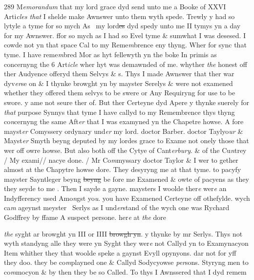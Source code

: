\documentclass[12pt, a4paper]{book}
\begin{document}
{\color{Mahogany}289} M\textit{emorandum} that my lord grace dyd send unto me a Booke of XXVI Arti\textit{cles that} I shelde make Awnswer unto them wyth spede. Trewly y had so lytyle a tyme for so mych As  my lord\sout{es}
               dyd 
			spedy unto me II tymys yn a day for my Awnswer. ffor so mych as I had so Evel tyme \& sumwhat I was desesed. I cowde not yn that space Cal to my Reme\textit{m}brence eny thyng. Wher for sync that tyme. I have reme\textit{m}bred Mor as hyt fellewyth yn the boke  In primis as concernyng the 6 Art\textit{icle} wher hyt was 
			demawnded of me. whyther \textit{the} honest off ther Audyence offeryd them Selvys \& s.  Thys I made Awnswer that ther war dyv\textit{er}se on \& I thynke browght yn by mayster Serelys \& were not examened whether they offered them selvys to be swere or Any Requiryng for use to be swore. y ame not seure ther of. But ther Certeyne dyd Apere y thynke suerely for \textit{that} purpose  Synnys that tyme I have callyd to my Remembrence thys thyng co\textit{n}cernyng the same Aft\textit{er} that I was examyned yn the Chapetre howse. A fore mayst\textit{er} Comyssery ordynary und\textit{er} my lord. doctor Barber. doctor Taylyo\textit{ur} \& Mayst\textit{er} Smyth beyng deputed by my lordes grace to Exame not onely those that wer off owre howse. But also both off the Cytye of Cant\textit{erbury}. \& of the Cu\textit{n}trey / My exami//  nacye done. / Mr Co\textit{m}myssary doctor Taylor \& I wer to gether almost at the  Chapytre howse dore. They desyryng me at that tyme. to pacyfy mayster Sayntleger 
			beyng \sout{beyng }be fore me Examened \& owte of pacyens as they they seyde to me
			. Then I sayde a gayne. maysters I woolde ther\textit{e} wer\textit{e} an Indyfferency used Amo\textit{n}gst yo\textit{u}. you have Examened Certeyne off othefylde. wych ca\textit{m} ageynst meyster  Serlys as I und\textit{er}stand of the wych one was Rychard Godffrey by ffame A suspect persone. her\textit{e} at \textit{the} dore \textit{}
               
                  \textit{the} syght 
			ar browght yn III or IIII \sout{browgh yn}. y thynke by mr Serlys. Thys not wyth standyng alle they were yn Syght they wer\textit{e} not Callyd yn to Examynacyon  Item whither they that woolde speke a gaynst Evyll opynyons. dar not for yff they doo. they be co\textit{m}playned one \& Callyd Sodycyowse \textit{per}sons. Styryng men to co\textit{m}mocyon \& by then they be so Called.  To thys I Awnssered that I dyd remem
                  
\end{document}
